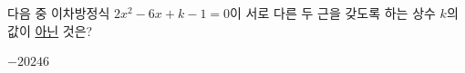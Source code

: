다음 중 이차방정식 $2x^2-6x+k-1=0$이 서로 다른 두 근을 갖도록 하는 상수 $k$의 값이 \underline{아닌} 것은?
\begin{choices32}{$-2$}{$0$}{$2$}{$4$}{$6$}\end{choices32}
